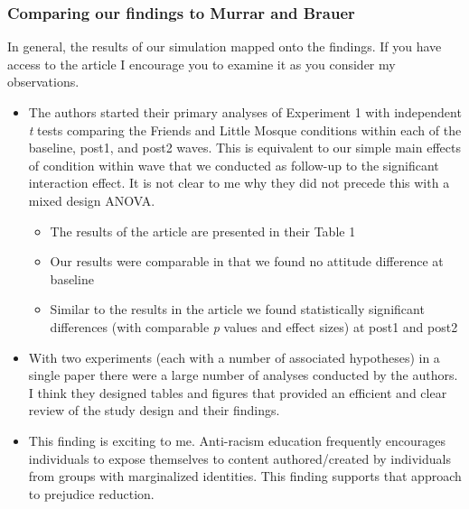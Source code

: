 \documentclass[
  11pt,
]{book}
\providecommand{\tightlist}{%
  \setlength{\itemsep}{0pt}\setlength{\parskip}{0pt}}
\begin{document}
\hypertarget{comparing-our-findings-to-murrar-and-brauer--murrar_entertainment-education_2018}{%
\subsubsection{\texorpdfstring{Comparing our findings to Murrar and Brauer \citeyearpar{murrar_entertainment-education_2018}}{Comparing our findings to Murrar and Brauer {[}-@murrar\_entertainment-education\_2018{]}}}\label{comparing-our-findings-to-murrar-and-brauer--murrar_entertainment-education_2018}}

In general, the results of our simulation mapped onto the findings. If you have access to the article I encourage you to examine it as you consider my observations.

\begin{itemize}
\tightlist
\item
  The authors started their primary analyses of Experiment 1 with independent \emph{t} tests comparing the Friends and Little Mosque conditions within each of the baseline, post1, and post2 waves. This is equivalent to our simple main effects of condition within wave that we conducted as follow-up to the significant interaction effect. It is not clear to me why they did not precede this with a mixed design ANOVA.

  \begin{itemize}
  \tightlist
  \item
    The results of the article are presented in their Table 1
  \item
    Our results were comparable in that we found no attitude difference at baseline
  \item
    Similar to the results in the article we found statistically significant differences (with comparable \emph{p} values and effect sizes) at post1 and post2
  \end{itemize}
\item
  With two experiments (each with a number of associated hypotheses) in a single paper there were a large number of analyses conducted by the authors. I think they designed tables and figures that provided an efficient and clear review of the study design and their findings.
\item
  This finding is exciting to me. Anti-racism education frequently encourages individuals to expose themselves to content authored/created by individuals from groups with marginalized identities. This finding supports that approach to prejudice reduction.
\end{itemize}
\end{document}

